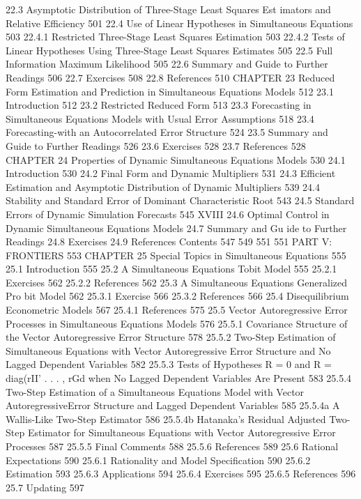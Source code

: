 {22.3 Asymptotic Distribution of Three-Stage Least Squares Est imators and
Relative Efficiency 501
22.4 Use of Linear Hypotheses in Simultaneous Equations 503
22.4.1 Restricted Three-Stage Least Squares Estimation 503
22.4.2 Tests of Linear Hypotheses Using Three-Stage Least Squares Estimates 505
22.5 Full Information Maximum Likelihood 505
22.6 Summary and Guide to Further Readings 506
22.7 Exercises 508
22.8 References 510
CHAPTER 23
Reduced Form Estimation and Prediction in Simultaneous
Equations Models 512
23.1 Introduction 512
23.2 Restricted Reduced Form 513
23.3 Forecasting in Simultaneous Equations Models with Usual Error
Assumptions 518
23.4 Forecasting-with an Autocorrelated Error Structure 524
23.5 Summary and Guide to Further Readings 526
23.6 Exercises 528
23.7 References 528
CHAPTER 24
Properties of Dynamic Simultaneous Equations Models 530
24.1 Introduction 530
24.2 Final Form and Dynamic Multipliers 531
24.3 Efficient Estimation and Asymptotic Distribution of Dynamic Multipliers 539
24.4 Stability and Standard Error of Dominant Characteristic Root 543
24.5 Standard Errors of Dynamic Simulation Forecasts 545
XVIII
24.6 Optimal Control in Dynamic Simultaneous Equations Models
24.7 Summary and Gu ide to Further Readings
24.8 Exercises
24.9 References
Contents
547
549
551
551
PART V: FRONTIERS 553
CHAPTER 25
Special Topics in Simultaneous Equations 555
25.1 Introduction 555
25.2 A Simultaneous Equations Tobit Model 555
25.2.1 Exercises 562
25.2.2 References 562
25.3 A Simultaneous Equations Generalized Pro bit Model 562
25.3.1 Exercise 566
25.3.2 References 566
25.4 Disequilibrium Econometric Models 567
25.4.1 References 575
25.5 Vector Autoregressive Error Processes in Simultaneous Equations Models 576
25.5.1 Covariance Structure of the Vector Autoregressive Error Structure 578
25.5.2 Two-Step Estimation of Simultaneous Equations with Vector
Autoregressive Error Structure and No Lagged Dependent Variables 582
25.5.3 Tests of Hypotheses R = 0 and R = diag(rII' . . . , rGd when No
Lagged Dependent Variables Are Present 583
25.5.4 Two-Step Estimation of a Simultaneous Equations Model with
Vector AutoregressiveError Structure and Lagged Dependent Variables 585
25.5.4a A Wallis-Like Two-Step Estimator 586
25.5.4b Hatanaka's Residual Adjusted Two-Step Estimator for
Simultaneous Equations with Vector Autoregressive
Error Processes 587
25.5.5 Final Comments 588
25.5.6 References 589
25.6 Rational Expectations 590
25.6.1 Rationality and Model Specification 590
25.6.2 Estimation 593
25.6.3 Applications 594
25.6.4 Exercises 595
25.6.5 References 596
25.7 Updating 597
}
